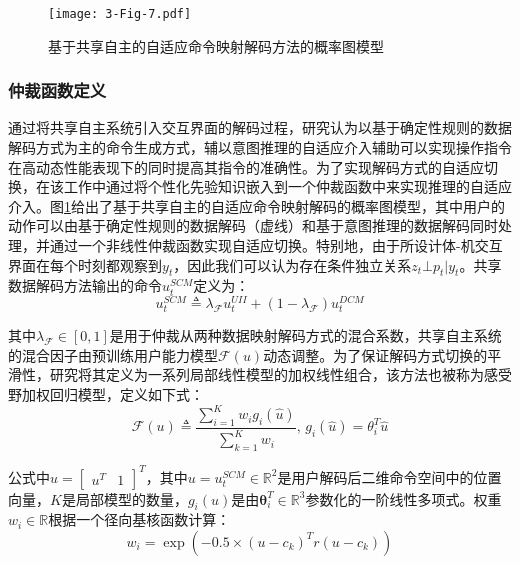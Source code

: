 \begin{figure}[htb]
    \centering
    \texttt{[image: 3-Fig-7.pdf]}
    \caption{基于共享自主的自适应命令映射解码方法的概率图模型}
    \label{fig:3-7}
\end{figure} 

\subsubsection{仲裁函数定义} 
通过将共享自主系统引入交互界面的解码过程，研究认为以基于确定性规则的数据解码方式为主的命令生成方式，辅以意图推理的自适应介入辅助可以实现操作指令在高动态性能表现下的同时提高其指令的准确性。为了实现解码方式的自适应切换，在该工作中通过将个性化先验知识嵌入到一个仲裁函数中来实现推理的自适应介入。图\ref{fig:3-7}给出了基于共享自主的自适应命令映射解码的概率图模型，其中用户的动作可以由基于确定性规则的数据解码（虚线）和基于意图推理的数据解码同时处理，并通过一个非线性仲裁函数实现自适应切换。特别地，由于所设计体-机交互界面在每个时刻都观察到${y_t}$，因此我们可以认为存在条件独立关系${z_t} \bot {p_t}|{y_t}$。共享数据解码方法输出的命令$u_t^{SCM}$定义为：
\begin{equation}
    \label{ex6}
    u_t^{SCM}\triangleq \lambda_{\mathcal{F}} u_t^{UII}+(1-\lambda_{\mathcal{F}})u_t^{DCM}
\end{equation}   

其中$\lambda_{\mathcal{F}}  \in [0,1]$是用于仲裁从两种数据映射解码方式的混合系数，共享自主系统的混合因子由预训练用户能力模型$\mathcal{F}(u)$动态调整。为了保证解码方式切换的平滑性，研究将其定义为一系列局部线性模型的加权线性组合，该方法也被称为感受野加权回归模型\cite{schaalScalableTechniquesNonparametric2002}，定义如下式：
\begin{equation}
    \label{ex7}
    \mathcal{F} (u) \triangleq \frac{{\sum\nolimits_{i = 1}^K {{w_i}{g_i}(\hat u)} }}{{\sum\nolimits_{k = 1}^K {{w_i}} }}{\text{,  }}{g_i}(\hat u) = {\theta}_i^T{\hat u}
\end{equation}

公式中$\hat u = {[\begin{array}{*{20}{c}}{{u^T}}&1\end{array}]^T}$，其中${u} = u_t^{SCM}\in {\mathbb{R}^2}$是用户解码后二维命令空间中的位置向量，$K$是局部模型的数量，${g_i}(u)$是由${\boldsymbol{\theta }}_i^T \in {\mathbb{R}^{3}}$参数化的一阶线性多项式。权重${w_i\in {\mathbb{R}}}$根据一个径向基核函数计算：
\begin{equation}
    \label{ex8}
    {w_i} = \exp \left( { - 0.5 \times {{(u - {{c}_k})}^T}{{r}}(u - {c_k})} \right)
\end{equation}

